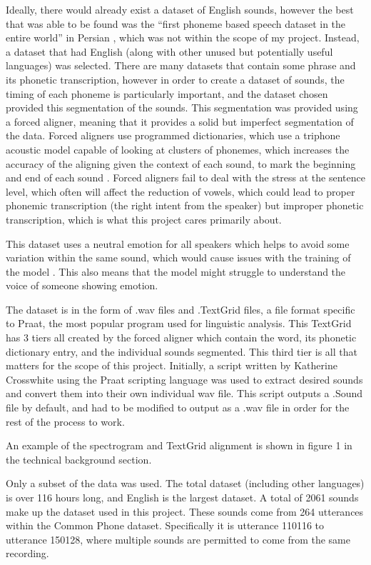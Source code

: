 \documentclass[10pt,twocolumn]{article}
\begin{document}
Ideally, there would already exist a dataset of English sounds, however the best that was able to be found was the “first phoneme based speech dataset in the entire world” in Persian \cite{PCVC}, which was not within the scope of my project. Instead, a dataset that had English (along with other unused but potentially useful languages) was selected. There are many datasets that contain some phrase and its phonetic transcription, however in order to create a dataset of sounds, the timing of each phoneme is particularly important, and the dataset chosen provided this segmentation of the sounds. This segmentation was provided using a forced aligner, meaning that it provides a solid but imperfect segmentation of the data. Forced aligners use programmed dictionaries, which use a triphone acoustic model capable of looking at clusters of phonemes, which increases the accuracy of the aligning given the context of each sound, to mark the beginning and end of each sound \cite{ForcedAligner}. Forced aligners fail to deal with the stress at the sentence level, which often will affect the reduction of vowels, which could lead to proper phonemic transcription (the right intent from the speaker) but improper phonetic transcription, which is what this project cares primarily about.



This dataset uses a neutral emotion for all speakers which helps to avoid some variation within the same sound, which would cause issues with the training of the model \cite{Emotion}. This also means that the model might struggle to understand the voice of someone showing emotion.

The dataset is in the form of .wav files and .TextGrid files, a file format specific to Praat, the most popular program used for linguistic analysis. This TextGrid has 3 tiers all created by the forced aligner which contain the word, its phonetic dictionary entry, and the individual sounds segmented. This third tier is all that matters for the scope of this project. Initially, a script written by Katherine Crosswhite using the Praat scripting language was used to extract desired sounds and convert them into their own individual wav file. This script outputs a .Sound file by default, and had to be modified to output as a .wav file in order for the rest of the process to work. 

An example of the spectrogram and TextGrid alignment is shown in figure 1 in the technical background section.


Only a subset of the data was used. The total dataset (including other languages) is over 116 hours long, and English is the largest dataset. A total of 2061 sounds make up the dataset used in this project. These sounds come from 264 utterances within the Common Phone dataset. Specifically it is utterance 110116 to utterance 150128, where multiple sounds are permitted to come from the same recording.
\end{document}
